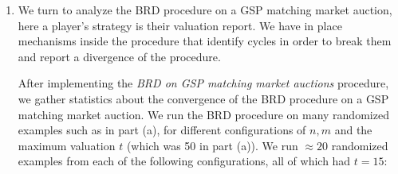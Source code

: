 \documentclass{article}
\begin{document}
\begin{enumerate}[label=(\alph*)]
    \begin{figure}[H]
        \centering
        \resizebox{0.5\textwidth}{!}{}
        \caption{VCG and GSP prices for bidders in a context where they are different}
        \label{fig:b2b_different_1}
    \end{figure}

    \FloatBarrier

    An additional context in which the VCG and GSP prices are wildly different is when the bundle sizes are relatively small and similar, and where the valuations of the bidders for the singular good are such that $t_i \gg t_{i+1} \cdot (n - i)$. For instance, take $n = m = 10$, $t_i = 2^{i + 3}$, and $c_i = n - i + 1$. In this case,

    \begin{center}
        $p^{VCG}_i = \sum_{j=i+1}^{n} \left( c_{j-1} - c_j \right) \cdot t_j = \sum_{j=i+1}^{n} t_j \ll t_{i+1} \cdot (n - i) \approx t_{i+1} \cdot c_i = p^{GSP}_i$
    \end{center}

    This is indeed what we see in .

    \FloatBarrier

    \begin{figure}[H]
        \centering
        \resizebox{0.5\textwidth}{!}{}
        \caption{VCG and GSP prices for bidders in a context where they are different}
        \label{fig:b2b_different_2}
    \end{figure}

    \FloatBarrier

    \item We turn to analyze the BRD procedure on a GSP matching market auction, here a player's strategy is their valuation report. We have in place mechanisms inside the procedure that identify cycles in order to break them and report a divergence of the procedure.
    
    After implementing the \textit{BRD on GSP matching market auctions} procedure, we gather statistics about the convergence of the BRD procedure on a GSP matching market auction. We run the BRD procedure on many randomized examples such as in part (a), for different configurations of $n, m$ and the maximum valuation $t$ (which was 50 in part (a)). We run $\approx 20$ randomized examples from each of the following configurations, all of which had $t = 15$:


\end{enumerate}
\end{document}
